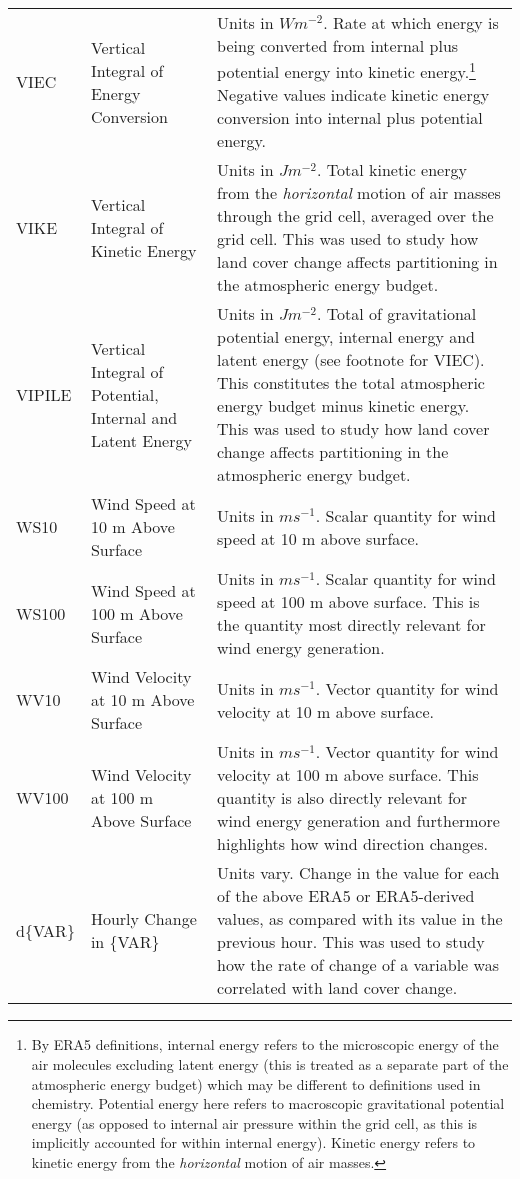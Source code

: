 \begin{landscape}
\begin{longtable}{P{2cm}P{3cm}P{13cm}}
		\acs{VIEC} & Vertical Integral of Energy Conversion & Units in $W m^{-2}$. Rate at which energy is being converted from internal plus potential energy into kinetic energy.\footnote{By \ac{ERA5} definitions, internal energy refers to the microscopic energy of the air molecules excluding latent energy (this is treated as a separate part of the atmospheric energy budget) which may be different to definitions used in chemistry. Potential energy here refers to macroscopic gravitational potential energy (as opposed to internal air pressure within the grid cell, as this is implicitly accounted for within internal energy). Kinetic energy refers to kinetic energy from the \textit{horizontal} motion of air masses.} Negative values indicate kinetic energy conversion into internal plus potential energy. \\
		\acs{VIKE} & Vertical Integral of Kinetic Energy & Units in $J m^{-2}$. Total kinetic energy from the \textit{horizontal} motion of air masses through the grid cell, averaged over the grid cell. This was used to study how land cover change affects partitioning in the atmospheric energy budget. \\
		\acs{VIPILE} & Vertical Integral of Potential, Internal and Latent Energy & Units in $J m^{-2}$. Total of gravitational potential energy, internal energy and latent energy (see footnote for \ac{VIEC}). This constitutes the total atmospheric energy budget minus kinetic energy. This was used to study how land cover change affects partitioning in the atmospheric energy budget. \\
		\acs{WS10} & Wind Speed at 10 m Above Surface & Units in $m s^{-1}$. Scalar quantity for wind speed at 10 m above surface. \\
		\acs{WS100} & Wind Speed at 100 m Above Surface & Units in $m s^{-1}$. Scalar quantity for wind speed at 100 m above surface. This is the quantity most directly relevant for wind energy generation. \\
		\acs{WV10} & Wind Velocity at 10 m Above Surface & Units in $m s^{-1}$. Vector quantity for wind velocity at 10 m above surface. \\
		\acs{WV100} & Wind Velocity at 100 m Above Surface & Units in $m s^{-1}$. Vector quantity for wind velocity at 100 m above surface. This quantity is also directly relevant for wind energy generation and furthermore highlights how wind direction changes. \\ \midrule
		d\{VAR\} & Hourly Change in \{VAR\} & Units vary. Change in the value for each of the above \ac{ERA5} or \ac{ERA5}-derived values, as compared with its value in the previous hour. This was used to study how the rate of change of a variable was correlated with land cover change. \\ \midrule

\end{longtable}
\end{landscape}
